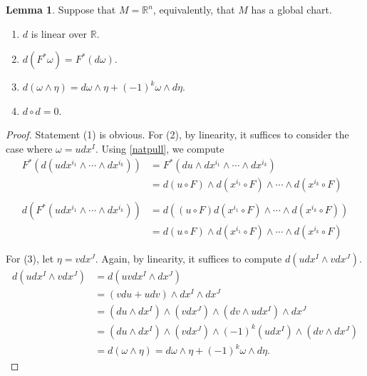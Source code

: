 \documentclass[10pt,letterpaper,cm]{nupset}
\theoremstyle{definition}
\theoremstyle{theorem}
\newtheorem{lemma}[definition]{Lemma}
\theoremstyle{remark}
\newcommand{\R}{\mathbb R}
\newcommand{\1}{\mathbf{1}}
\newcommand{\0}{\vec 0}
\begin{document}
\begin{lemma}\label{l15} Suppose that $M = \R^n$, equivalently, that $M$ has a global chart.
\begin{enumerate}[label=(\arabic*)]
\item $d$ is linear over $\R$.
\item $d(F^{\ast} \omega) = F^{\ast}(d \omega).$
\item $d( \omega \wedge \eta) = d \omega \wedge \eta + ({-1})^k\omega \wedge d \eta.$
\item $d \circ d = 0$.
\end{enumerate}
\end{lemma}
\begin{proof}
Statement (1) is obvious. For (2), by linearity, it suffices to consider the case where  $\omega = udx^I$. Using \cref{natpull}, we compute
\begin{align*}
F^{*}\left(d\left(u d x^{i_{1}} \wedge \cdots \wedge d x^{i_{k}}\right)\right) &=F^{*}\left(d u \wedge d x^{i_{1}} \wedge \cdots \wedge d x^{i_{k}}\right) \\
&=d(u \circ F) \wedge d\left(x^{i_{1}} \circ F\right) \wedge \cdots \wedge d\left(x^{i_{k}} \circ F\right)
\\ & 
\\ d\left(F^{*}\left(u d x^{i_{1}} \wedge \cdots \wedge d x^{i_{k}}\right)\right) &=d\left((u \circ F) d\left(x^{i_{1}} \circ F\right) \wedge \cdots \wedge d\left(x^{i_{k}} \circ F\right)\right) \\
&=d(u \circ F) \wedge d\left(x^{i_{1}} \circ F\right) \wedge \cdots \wedge d\left(x^{i_{k}} \circ F\right)
\end{align*} 

For (3), let $\eta = v dx^J$. Again, by linearity, it suffices to compute $d(udx^I \wedge v dx^J)$. 
\begin{align*}
d(udx^I \wedge vdx^J) & = d(uvdx^I \wedge dx^J)
\\ & = (vdu + udv) \wedge dx^I \wedge dx^J
\\ & = (du \wedge dx^I) \wedge (v dx^J) \wedge (dv \wedge u dx^I) \wedge dx^J
\\ & = (du \wedge dx^I) \wedge (v dx^J) \wedge ({-1})^k(udx^I) \wedge (dv \wedge dx^J)
\\ & = d( \omega \wedge \eta) = d \omega \wedge \eta + ({-1})^k\omega \wedge d \eta .
\end{align*}


\end{proof}
\end{document}
